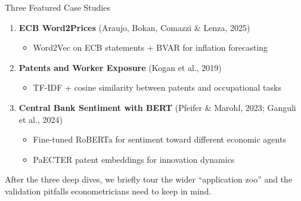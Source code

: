 \begin{frame}{Three Featured Case Studies}
\begin{enumerate}
\item \textbf{ECB Word2Prices} (Araujo, Bokan, Comazzi \& Lenza, 2025)
   \begin{itemize}
       \item Word2Vec on ECB statements + BVAR for inflation forecasting
   \end{itemize}

\medskip
\item \textbf{Patents and Worker Exposure} (Kogan et al., 2019)
   \begin{itemize}
       \item TF-IDF + cosine similarity between patents and occupational tasks
   \end{itemize}

\medskip
\item \textbf{Central Bank Sentiment with BERT} (Pfeifer \& Marohl, 2023; Ganguli et al., 2024)
   \begin{itemize}
       \item Fine-tuned RoBERTa for sentiment toward different economic agents
       \item PaECTER patent embeddings for innovation dynamics
   \end{itemize}
\end{enumerate}

\medskip
After the three deep dives, we briefly tour the wider ``application zoo'' and the validation pitfalls econometricians need to keep in mind.
\end{frame}

